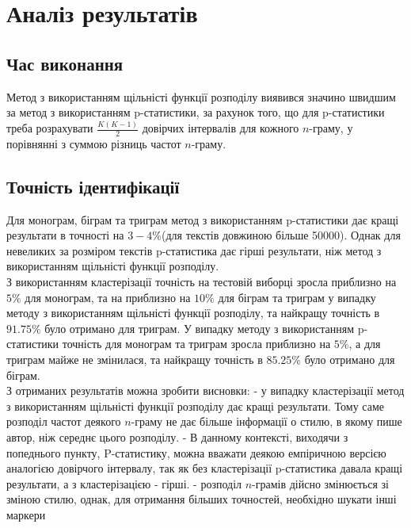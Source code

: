 \documentclass[12pt, a4paper]{extarticle}
\begin{document}
\section{Аналіз результатів}
\subsection{Час виконання}
Метод з використанням щільністі функції розподілу виявився значино швидшим за метод з використанням p-статистики, за рахунок того, що для p-статистики треба розрахувати $\frac{K(K-1)}{2}$ довірчих інтервалів для кожного $n$-граму, у порівнянні з суммою різниць частот $n$-граму.
\subsection{Точність ідентифікації}
Для монограм, біграм та триграм метод з використанням p-статистики дає кращі результати в точності на $3-4\%$(для текстів довжиною більше 50000). Однак для невеликих за розміром текстів p-статистика дає гірші результати, ніж метод з використанням щільністі функції розподілу.\\

З використанням кластерізації точність на тестовій виборці зросла приблизно на $5\%$ для монограм, та на приблизно на $10\%$ для біграм та триграм у випадку методу з використанням щільністі функції розподілу, та найкращу точність в $91.75\%$ було отримано для триграм. У випадку методу з використанням p-статистики точність для монограм та триграм зросла приблизно на $5\%$, а для триграм майже не змінилася, та найкращу точність в $85.25\%$ було отримано для біграм.\\
З отриманих результатів можна зробити висновки:
- у випадку кластерізації метод з використанням щільністі функції розподілу дає кращі результати. Тому саме розподіл частот деякого $n$-граму не дає більше інформації о стилю, в якому пише автор, ніж середнє цього розподілу.
- В данному контексті, виходячи з попеднього пункту, P-статистику, можна вважати деякою емпіричною версією аналогією довірчого інтервалу, так як без кластерізації p-статистика давала кращі результати, а з кластерізацією - гірші.
- розподіл $n$-грамів дійсно змінюється зі зміною стилю, однак, для отримання більших точностей, необхідно шукати інші маркери
\end{document}
